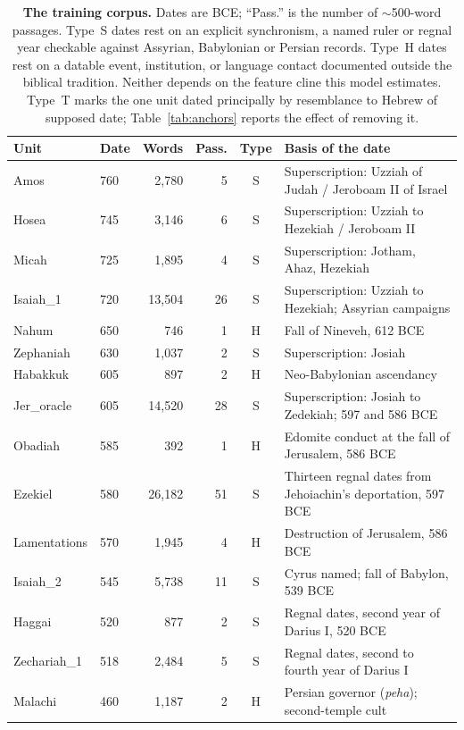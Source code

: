 \begin{table}[!ht]
\centering
\footnotesize
\caption{\textbf{The training corpus.}  Dates are BCE; ``Pass.'' is the number of $\sim$500-word passages.  Type~S dates rest on an explicit synchronism, a named ruler or regnal year checkable against Assyrian, Babylonian or Persian records.  Type~H dates rest on a datable event, institution, or language contact documented outside the biblical tradition.  Neither depends on the feature cline this model estimates.  Type~T marks the one unit dated principally by resemblance to Hebrew of supposed date; Table~\ref{tab:anchors} reports the effect of removing it.}
\label{tab:corpus}
\begin{tabular}{llrrcp{4.6cm}}
\toprule
\textbf{Unit} & \textbf{Date} & \textbf{Words} & \textbf{Pass.} & \textbf{Type} & \textbf{Basis of the date} \\
\midrule
Amos & 760 & 2,780 & 5 & S & Superscription: Uzziah of Judah / Jeroboam II of Israel \\
Hosea & 745 & 3,146 & 6 & S & Superscription: Uzziah to Hezekiah / Jeroboam II \\
Micah & 725 & 1,895 & 4 & S & Superscription: Jotham, Ahaz, Hezekiah \\
Isaiah\_1 & 720 & 13,504 & 26 & S & Superscription: Uzziah to Hezekiah; Assyrian campaigns \\
Nahum & 650 & 746 & 1 & H & Fall of Nineveh, 612 BCE \\
Zephaniah & 630 & 1,037 & 2 & S & Superscription: Josiah \\
Habakkuk & 605 & 897 & 2 & H & Neo-Babylonian ascendancy \\
Jer\_oracle & 605 & 14,520 & 28 & S & Superscription: Josiah to Zedekiah; 597 and 586 BCE \\
Obadiah & 585 & 392 & 1 & H & Edomite conduct at the fall of Jerusalem, 586 BCE \\
Ezekiel & 580 & 26,182 & 51 & S & Thirteen regnal dates from Jehoiachin's deportation, 597 BCE \\
Lamentations & 570 & 1,945 & 4 & H & Destruction of Jerusalem, 586 BCE \\
Isaiah\_2 & 545 & 5,738 & 11 & S & Cyrus named; fall of Babylon, 539 BCE \\
Haggai & 520 & 877 & 2 & S & Regnal dates, second year of Darius I, 520 BCE \\
Zechariah\_1 & 518 & 2,484 & 5 & S & Regnal dates, second to fourth year of Darius I \\
Malachi & 460 & 1,187 & 2 & H & Persian governor (\textit{peha}); second-temple cult \\

\end{tabular}
\end{table}
